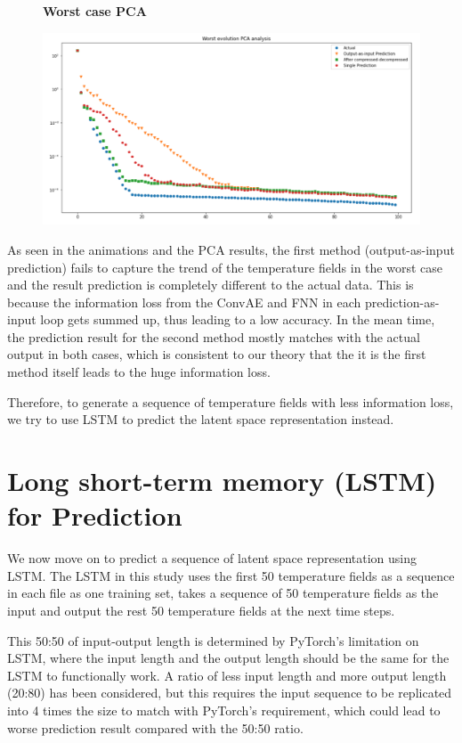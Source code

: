 \begin{figure}[H]
    \textbf{Worst case PCA}\par\medskip
    \includegraphics[scale=0.5]{Report LaTeX/figures/mantle_convection_images/Worst_case_PCA_FNN.png}
\end{figure}

As seen in the animations and the PCA results, the first method (output-as-input prediction) fails to capture the trend of the temperature fields in the worst case and the result prediction is completely different to the actual data. This is because the information loss from the ConvAE and FNN in each prediction-as-input loop gets summed up, thus leading to a low accuracy. In the mean time, the prediction result for the second method mostly matches with the actual output in both cases, which is consistent to our theory that the it is the first method itself leads to the huge information loss.

Therefore, to generate a sequence of temperature fields with less information loss, we try to use LSTM to predict the latent space representation instead.


\section{Long short-term memory (LSTM) for Prediction}

We now move on to predict a sequence of latent space representation using LSTM. The LSTM in this study uses the first 50 temperature fields as a sequence in each file as one training set, takes a sequence of 50 temperature fields as the input and output the rest 50 temperature fields at the next time steps.

This 50:50 of input-output length is determined by PyTorch's limitation on LSTM, where the input length and the output length should be the same for the LSTM to functionally work. A ratio of less input length and more output length (20:80) has been considered, but this requires the input sequence to be replicated into 4 times the size to match with PyTorch's requirement, which could lead to worse prediction result compared with the 50:50 ratio.

